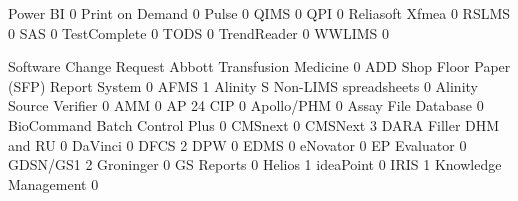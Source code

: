 \documentclass{article}
\begin{document}
\begin{Schunk}
\begin{Soutput}
  Power BI                                               0
  Print on Demand                                        0
  Pulse                                                  0
  QIMS                                                   0
  QPI                                                    0
  Reliasoft Xfmea                                        0
  RSLMS                                                  0
  SAS                                                    0
  TestComplete                                           0
  TODS                                                   0
  TrendReader                                            0
  WWLIMS                                                 0
                                          
                                           Software Change Request
  Abbott Transfusion Medicine                                    0
  ADD Shop Floor Paper (SFP) Report System                       0
  AFMS                                                           1
  Alinity S Non-LIMS spreadsheets                                0
  Alinity Source Verifier                                        0
  AMM                                                            0
  AP 24 CIP                                                      0
  Apollo/PHM                                                     0
  Assay File Database                                            0
  BioCommand Batch Control Plus                                  0
  CMSnext                                                        0
  CMSNext                                                        3
  DARA Filler DHM and RU                                         0
  DaVinci                                                        0
  DFCS                                                           2
  DPW                                                            0
  EDMS                                                           0
  eNovator                                                       0
  EP Evaluator                                                   0
  GDSN/GS1                                                       2
  Groninger                                                      0
  GS Reports                                                     0
  Helios                                                         1
  ideaPoint                                                      0
  IRIS                                                           1
  Knowledge Management                                           0

\end{Soutput}
\end{Schunk}
\end{document}
